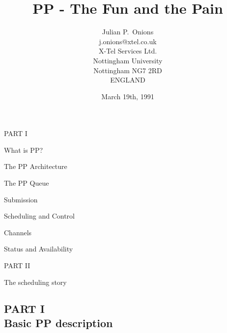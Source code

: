 

\raggedright


\title	{PP - The Fun and the Pain}

\author{Julian P.~Onions\\
j.onions@xtel.co.uk\\[.5in]
X-Tel Services Ltd.\\
Nottingham University\\
Nottingham NG7 2RD\\
ENGLAND}

\date	{March 19th, 1991}

\maketitle

\begin{bwslide}
PART I
\begin{nrtc}
\item	What is PP?

\item	The PP Architecture

\item	The PP Queue

\item	Submission

\item	Scheduling and Control

\item	Channels

\item	Status and Availability
\end{nrtc}
PART II
\begin{nrtc}
\item The scheduling story
\end{nrtc}
\end{bwslide}

\begin{bwslide}
\part*{PART I\\
Basic PP description}
\end{bwslide}

